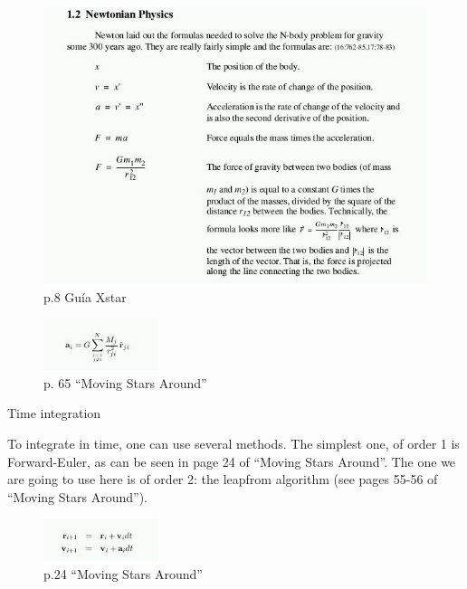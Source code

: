 \begin{figure}[!htbp]
  \centering
  \includegraphics[width=\textwidth]{graphics/nbody-fig1.png}
  \caption{p.8 Guía Xstar}
\end{figure}


\begin{figure}[!htbp]
  \centering
  \includegraphics[width=0.3\textwidth]{graphics/nbody-fig2.png}
  \caption{p. 65 ``Moving Stars Around''}
\end{figure}

 {Time integration}
\label{sec:nbody-time-integration}


To integrate in time, one can use several methods. The simplest one, of order 1
is Forward-Euler, as can be seen in page 24 of ``Moving Stars
Around''. The one we are going to use here is of order 2: the leapfrom algorithm
(see pages 55-56 of ``Moving Stars Around'').

\begin{figure}[!htbp]
  \centering
  \includegraphics[width=0.3\textwidth]{graphics/nbody-fig3.png}
  \caption{p.24 ``Moving Stars Around''}
\end{figure}


